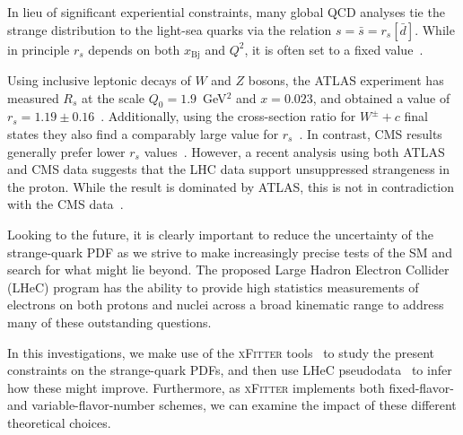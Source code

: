 \documentclass[pdftex,twocolumn,epjc3]{svjour3}          %
\newcommand{\xfitter} {\textsc{xFitter}\xspace}
\newcommand{\xbj}{\ensuremath{x_{\text{Bj}}}\xspace}
\begin{document}
In lieu of significant experiential constraints, many global QCD
analyses tie the strange distribution to the light-sea quarks via the
relation $s= \bar{s}=r_s[\bar{d}]$.
%
While in principle $r_s$ depends on both \xbj and $Q^2$, it is often
set to a fixed value~\cite{Kretzer:2003it, Martin:2004ir}.

Using inclusive leptonic decays of $W$ and $Z$ bosons, the ATLAS
experiment has measured $R_s$ at the scale $Q_0 = 1.9$~GeV$^2$ and
$x= 0.023$, and obtained a value of $r_s=1.19 \pm 0.16$~\cite{Aaboud:2016btc}.
%
Additionally, using the cross-section ratio for $W^\pm +c$ final
states they also find a comparably large value for $r_s$~\cite{Aad:2014xca}.
%
In contrast, CMS results generally prefer lower $r_s$
values~\cite{Chatrchyan:2013uja,Sirunyan:2018hde}.  However, a recent analysis using
both ATLAS and CMS data suggests that the LHC data support
unsuppressed strangeness in the proton. While the result is dominated
by ATLAS, this is not in contradiction with the CMS
data~\cite{Cooper-Sarkar:2018ufj,Aaboud:2016btc,Aad:2014xca,Chatrchyan:2013uja}.

Looking to the future, it is clearly important to reduce the
uncertainty of the strange-quark PDF as we strive to make increasingly
precise tests of the SM and search for what might lie beyond.
%
The proposed Large Hadron Electron Collider (LHeC) program has the
ability to provide high statistics measurements of electrons on both
protons and nuclei across a broad kinematic range to address many of
these outstanding questions.

In this investigations, we make use of the \xfitter
tools~\cite{Alekhin:2014irh} to study the present constraints on the
strange-quark PDFs, and then use LHeC pseudodata~\cite{AbelleiraFernandez:2012cc} to infer how these
might improve. Furthermore, as \xfitter implements both fixed-flavor-
and variable-flavor-number schemes, we can examine the impact of these
different theoretical choices.

%  
%  
\end{document}
